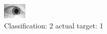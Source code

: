 \begin{figure}[h!]
\begin{center}
\includegraphics[width=0.60\columnwidth]{figures/ID1511_class_2_target_1.png}
\end{center}
\caption{ Classification: 2 actual target: 1}
\label{fig:ID1511_class_2_target_1}
\end{figure}
